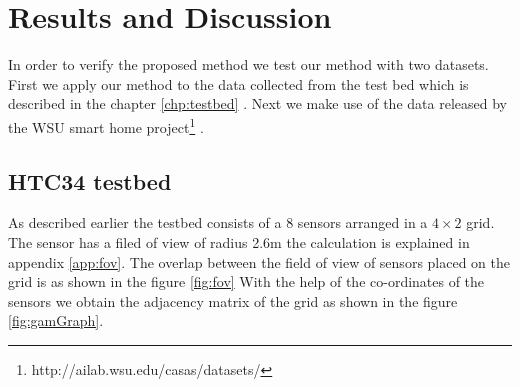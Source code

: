 \chapter{Results and Discussion}
In order to verify the proposed method we test our method with two datasets. First we apply our method to the data collected from the test bed which is described in the chapter \ref{chp:testbed} . Next we make use of the data released by the WSU smart home project\footnote{http://ailab.wsu.edu/casas/datasets/} \cite{cook2009assessing}.
\section{HTC34 testbed}
As described earlier the testbed consists of a 8 sensors arranged in a $4 \times 2$ grid. The sensor has a filed of view of radius 2.6m the calculation is explained in appendix \ref{app:fov}. The overlap between the field of view of sensors placed on the grid is as shown in the figure \ref{fig:fov} With the help of the co-ordinates of the sensors we obtain the adjacency matrix of the grid as shown in the figure \ref{fig:gamGraph}.



